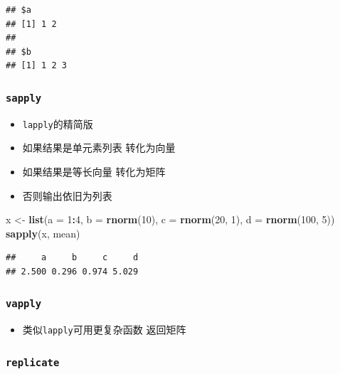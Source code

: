 \documentclass[]{book}
\newenvironment{Shaded}{\begin{snugshade}}{\end{snugshade}}
\newcommand{\DataTypeTok}[1]{\textcolor[rgb]{0.13,0.29,0.53}{#1}}
\newcommand{\DecValTok}[1]{\textcolor[rgb]{0.00,0.00,0.81}{#1}}
\newcommand{\KeywordTok}[1]{\textcolor[rgb]{0.13,0.29,0.53}{\textbf{#1}}}
\newcommand{\NormalTok}[1]{#1}
\newcommand{\OperatorTok}[1]{\textcolor[rgb]{0.81,0.36,0.00}{\textbf{#1}}}
\newcommand{\StringTok}[1]{\textcolor[rgb]{0.31,0.60,0.02}{#1}}
\providecommand{\tightlist}{%
  \setlength{\itemsep}{0pt}\setlength{\parskip}{0pt}}
\begin{document}
\begin{verbatim}
## $a
## [1] 1 2
## 
## $b
## [1] 1 2 3
\end{verbatim}

\hypertarget{sapply}{%
\subsubsection{\texorpdfstring{\texttt{sapply}}{sapply}}\label{sapply}}

\begin{itemize}
\tightlist
\item
  \texttt{lapply}的精简版
\item
  如果结果是单元素列表 转化为向量
\item
  如果结果是等长向量 转化为矩阵
\item
  否则输出依旧为列表
\end{itemize}

\begin{Shaded}
\begin{Highlighting}[]
\NormalTok{x <-}\StringTok{ }\KeywordTok{list}\NormalTok{(}\DataTypeTok{a =} \DecValTok{1}\OperatorTok{:}\DecValTok{4}\NormalTok{, }\DataTypeTok{b =} \KeywordTok{rnorm}\NormalTok{(}\DecValTok{10}\NormalTok{), }\DataTypeTok{c =} \KeywordTok{rnorm}\NormalTok{(}\DecValTok{20}\NormalTok{, }\DecValTok{1}\NormalTok{), }\DataTypeTok{d =} \KeywordTok{rnorm}\NormalTok{(}\DecValTok{100}\NormalTok{, }\DecValTok{5}\NormalTok{))}
\KeywordTok{sapply}\NormalTok{(x, mean)}
\end{Highlighting}
\end{Shaded}

\begin{verbatim}
##     a     b     c     d 
## 2.500 0.296 0.974 5.029
\end{verbatim}

\hypertarget{vapply}{%
\subsubsection{\texorpdfstring{\texttt{vapply}}{vapply}}\label{vapply}}

\begin{itemize}
\tightlist
\item
  类似\texttt{lapply}可用更复杂函数 返回矩阵
\end{itemize}

\hypertarget{replicate}{%
\subsubsection{\texorpdfstring{\texttt{replicate}}{replicate}}\label{replicate}}
\end{document}
